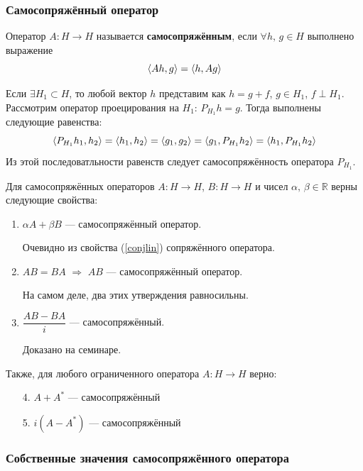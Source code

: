 \documentclass[12pt]{article}
\begin{document}
	\subsubsection{Самосопряжённый оператор}
	
	\begin{defi}
		Оператор $A : H \rightarrow H$ называется \textbf{самосопряжённым}, если $\forall h,\, g \in H$ выполнено выражение
		$$\left\langle Ah, g \right\rangle = \left\langle h, Ag \right\rangle$$
	\end{defi}
	
	\example Если $\exists H_1 \subset H$, то любой вектор $h$ представим как $h = g+f$, $g \in H_1$, $f\perp H_1$.
	Рассмотрим оператор проецирования на $H_1$: $P_{H_1}h = g$. Тогда выполнены следующие равенства:
	$$\left\langle P_{H_1}h_1, h_2 \right\rangle = \left\langle h_1, h_2 \right\rangle = \left\langle g_1, g_2 \right\rangle = \left\langle g_1, P_{H_1}h_2 \right\rangle = \left\langle h_1, P_{H_1}h_2 \right\rangle$$
	Из этой последоватльности равенств следует самосопряжённость оператора $P_{H_1}$.
	
	Для самосопряжённых операторов $A : H \rightarrow H$, $B : H \rightarrow H$ и чисел $\alpha,\, \beta \in \mathbb{R}$ верны следующие
	свойства:
	\begin{enumerate}
		\item $\alpha A + \beta B$ --- самосопряжённый оператор.

		Очевидно из свойства (\ref{conjlin}) сопряжённого оператора.
		
		\item $AB = BA$ $\Rightarrow$ $AB$ --- самосопряжённый оператор.
		

		На самом деле, два этих утверждения равносильны.
		
		\item $\dfrac{AB - BA}{i}$ --- самосопряжённый.
		
		{\color{gray}
		Доказано на семинаре.
		}
	\end{enumerate}
	Также, для любого ограниченного оператора $A: H \rightarrow H$ верно:
	\begin{enumerate}
		\item[4.] $A+A^{*}$ --- самосопряжённый
		\item[5.] $i(A-A^{*})$ --- самосопряжённый
	\end{enumerate}
	
	\subsubsection{Собственные значения самосопряжённого оператора}
	
\end{document}
